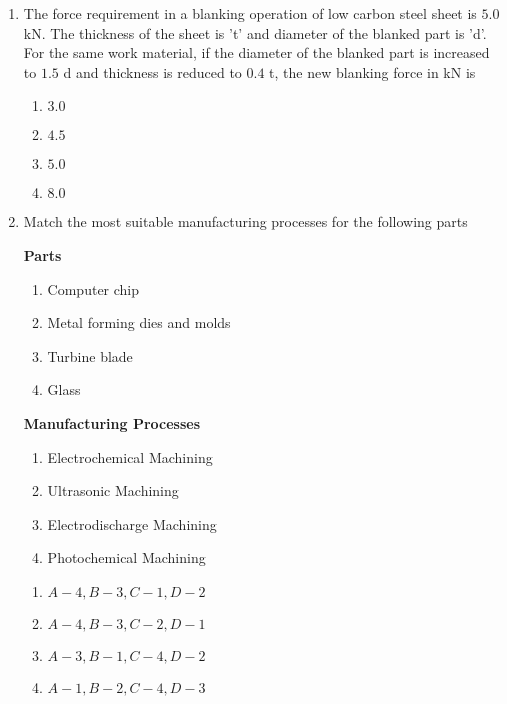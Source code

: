 \documentclass[journal]{IEEEtran}
\begin{document}
\begin{enumerate}[start = 52]
    \item The force requirement in a blanking operation of low carbon steel sheet is $5.0$ kN. The thickness of the sheet is 't' and diameter of the blanked part is 'd'. For the same work material, if the diameter of the blanked part is increased to $1.5$ d and thickness is reduced to $0.4$ t, the new blanking force in kN is
    \begin{multicols}{4}
        \begin{enumerate}
            \item $3.0$
            \item $4.5$
            \item $5.0$
            \item $8.0$
        \end{enumerate}
    \end{multicols}

    \item Match the most suitable manufacturing processes for the following parts
        \begin{multicols}{2}
			\textbf{Parts}
			\begin{enumerate}[label=(\Alph*)]
                
				\item Computer chip
				\item Metal forming dies and molds
                    \item Turbine blade
                    \item Glass
			\end{enumerate}
			\columnbreak
			\textbf{Manufacturing Processes}
			\begin{enumerate}[label=(\arabic*)]
				\item Electrochemical Machining
				\item Ultrasonic Machining
				\item Electrodischarge Machining
                    \item Photochemical Machining
			\end{enumerate}
		\end{multicols}

      \begin{multicols}{2}
        \begin{enumerate}
            \item $A-4,B-3,C-1,D-2$
            \item $A-4,B-3,C-2,D-1$
            \item $A-3,B-1,C-4,D-2$
            \item $A-1,B-2,C-4,D-3$
        \end{enumerate}
    \end{multicols}


\end{enumerate}
\end{document}
